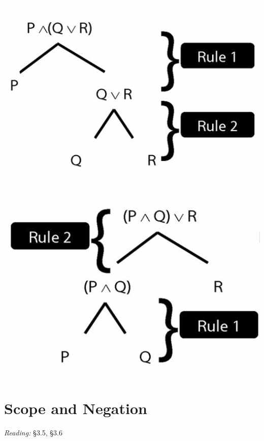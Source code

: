 \documentclass[12pt]{extarticle}
\begin{document}
\begin{multicols*}{3}
\begin{center}
\includegraphics[scale=0.3]{img/unit_292_fig1.png}
\end{center}
\begin{center}
\includegraphics[scale=0.3]{img/unit_292_fig2.png}
\end{center}
 
 
\section{Scope and Negation}
 
\emph{Reading:} §3.5, §3.6
 

\end{multicols*}
\end{document}
